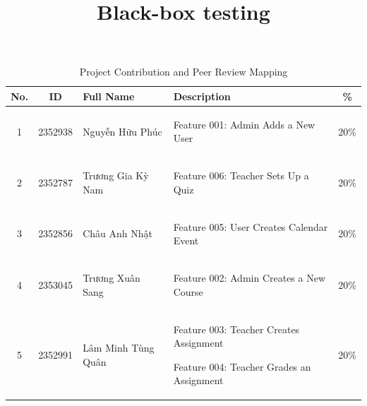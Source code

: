 \documentclass[twoside,final]{hcmut-report}
\title{Black-box testing}
\begin{document}
\coverpage%

\tableofcontents
\pagebreak
\begin{table}[ht]
    \centering
    \caption{Project Contribution and Peer Review Mapping}
    \vspace{0.2cm}
    
    \small 
    \renewcommand{\arraystretch}{1.4} %
    
    
    \begin{tabularx}{\textwidth}{|c|c|p{2.5cm}|>{\raggedright\arraybackslash}X|c|}
    \hline
    \textbf{No.} & \textbf{ID} & \textbf{Full Name} & \textbf{Description} & \textbf{\%} \\ \hline
    
    1 & 2352938 & Nguyễn Hữu Phúc & 
 
    \begin{filelist}
        \item Feature 001: Admin Adds a New User 
    \end{filelist} & 20\% \\ \hline
    
    2 & 2352787 & Trương Gia Kỳ Nam & 

    \begin{filelist}
       \item Feature 006: Teacher Sets Up a Quiz
    \end{filelist} & 20\% \\ \hline
    
    3 & 2352856 & Châu Anh Nhật & 

    \begin{filelist}
        \item Feature 005: User Creates Calendar Event
    \end{filelist} & 20\% \\ \hline
    
    4 & 2353045 & Trương Xuân Sang & 

    \begin{filelist}
       \item Feature 002: Admin Creates a New Course
    \end{filelist} & 20\% \\ \hline
    
    5 & 2352991 & Lâm Minh Tùng Quân & 
    \begin{filelist}
       \item Feature 003: Teacher Creates Assignment
        \item Feature 004: Teacher Grades an Assignment 
    \end{filelist} & 20\% \\ \hline
    
    \end{tabularx}
\end{table}
\newpage
\newpage
\end{document}
